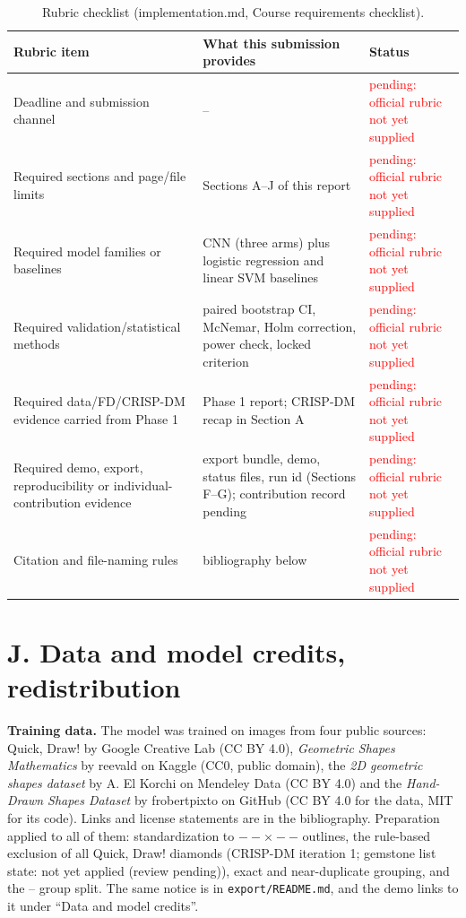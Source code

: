 \documentclass[11pt]{article}
\providecommand{\GemstoneFilterState}{not yet applied (review pending)}
\providecommand{\SplitRatios}{--}
\providecommand{\ImageSize}{--}
\newcommand{\pending}{\textcolor{red}{pending: official rubric not yet supplied}}
\begin{document}
\begin{table}[H]
\centering
\caption{Rubric checklist (implementation.md, Course requirements checklist).}
\label{tab:rubric}
\small
\begin{tabularx}{\linewidth}{@{}>{\raggedright\arraybackslash}p{5.2cm} >{\raggedright\arraybackslash}X p{4.6cm}@{}}
\toprule
Rubric item & What this submission provides & Status \\
\midrule
Deadline and submission channel & -- & \pending \\
Required sections and page/file limits & Sections A--J of this report & \pending \\
Required model families or baselines & CNN (three arms) plus logistic regression and linear SVM baselines & \pending \\
Required validation/statistical methods & paired bootstrap CI, McNemar, Holm correction, power check, locked criterion & \pending \\
Required data/FD/CRISP-DM evidence carried from Phase 1 & Phase 1 report; CRISP-DM recap in Section A & \pending \\
Required demo, export, reproducibility or individual-contribution evidence & export bundle, demo, status files, run id (Sections F--G); contribution record pending & \pending \\
Citation and file-naming rules & bibliography below & \pending \\
\bottomrule
\end{tabularx}
\end{table}

\section*{J. Data and model credits, redistribution}

\textbf{Training data.} The model was trained on images from four public
sources: Quick, Draw! by Google Creative Lab \cite{quickdraw} (CC BY 4.0),
\emph{Geometric Shapes Mathematics} by reevald on Kaggle \cite{kagglereevald}
(CC0, public domain), the \emph{2D geometric shapes dataset} by A. El Korchi
on Mendeley Data \cite{elkorchi} (CC BY 4.0) and the \emph{Hand-Drawn Shapes
Dataset} by frobertpixto on GitHub \cite{handdrawn} (CC BY 4.0 for the data,
MIT for its code). Links and license statements are in the bibliography.
Preparation applied to all of them: standardization to
$\ImageSize{\times}\ImageSize$ outlines, the rule-based exclusion of all Quick, Draw!
diamonds (CRISP-DM iteration 1; gemstone list state:
\GemstoneFilterState), exact and near-duplicate grouping, and the
\SplitRatios{} group split. The same notice is in
\nolinkurl{export/README.md}, and the demo links to it under ``Data and model
credits''.
\end{document}
